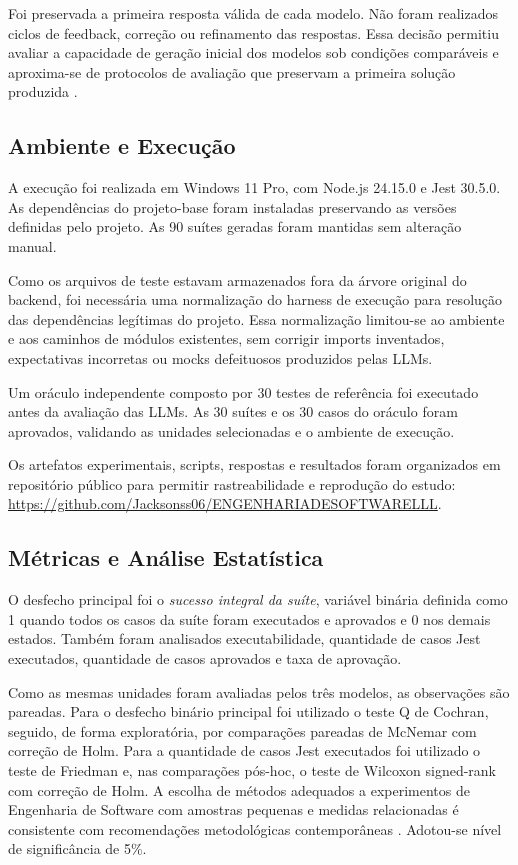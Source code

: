 \documentclass[12pt]{article}
\begin{document}
Foi preservada a primeira resposta válida de cada modelo. Não foram realizados ciclos de feedback, correção ou refinamento das respostas. Essa decisão permitiu avaliar a capacidade de geração inicial dos modelos sob condições comparáveis e aproxima-se de protocolos de avaliação que preservam a primeira solução produzida \cite{oliveira2025qualidade}.

\subsection{Ambiente e Execução}

A execução foi realizada em Windows 11 Pro, com Node.js 24.15.0 e Jest 30.5.0. As dependências do projeto-base foram instaladas preservando as versões definidas pelo projeto. As 90 suítes geradas foram mantidas sem alteração manual.

Como os arquivos de teste estavam armazenados fora da árvore original do backend, foi necessária uma normalização do harness de execução para resolução das dependências legítimas do projeto. Essa normalização limitou-se ao ambiente e aos caminhos de módulos existentes, sem corrigir imports inventados, expectativas incorretas ou mocks defeituosos produzidos pelas LLMs.

Um oráculo independente composto por 30 testes de referência foi executado antes da avaliação das LLMs. As 30 suítes e os 30 casos do oráculo foram aprovados, validando as unidades selecionadas e o ambiente de execução.

Os artefatos experimentais, scripts, respostas e resultados foram organizados em repositório público para permitir rastreabilidade e reprodução do estudo: \url{https://github.com/Jacksonss06/ENGENHARIADESOFTWARELLL}.

\subsection{Métricas e Análise Estatística}

O desfecho principal foi o \textit{sucesso integral da suíte}, variável binária definida como 1 quando todos os casos da suíte foram executados e aprovados e 0 nos demais estados. Também foram analisados executabilidade, quantidade de casos Jest executados, quantidade de casos aprovados e taxa de aprovação.

Como as mesmas unidades foram avaliadas pelos três modelos, as observações são pareadas. Para o desfecho binário principal foi utilizado o teste Q de Cochran, seguido, de forma exploratória, por comparações pareadas de McNemar com correção de Holm. Para a quantidade de casos Jest executados foi utilizado o teste de Friedman e, nas comparações pós-hoc, o teste de Wilcoxon signed-rank com correção de Holm. A escolha de métodos adequados a experimentos de Engenharia de Software com amostras pequenas e medidas relacionadas é consistente com recomendações metodológicas contemporâneas \cite{kitchenham2024small}. Adotou-se nível de significância de 5\%.
\end{document}

